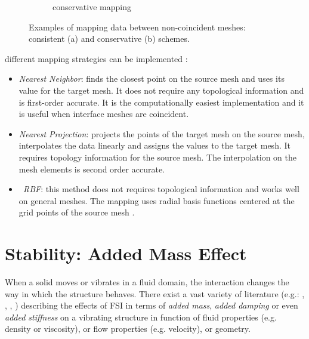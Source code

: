 \begin{figure}[htbp!]
\begin{subfigure}{.8\textwidth}
		\caption{conservative mapping}
		\label{fig:conservative}
	\end{subfigure}
	\caption{Examples of mapping data between non-coincident meshes: consistent (a) and conservative (b) schemes.}
	\label{fig:mapping}
\end{figure}


different mapping strategies can be implemented \cite{bungartz2016precice}:

\begin{itemize}
	\item \textit{Nearest Neighbor}: finds the closest point on the source mesh and uses its value for the target mesh. It does not require any topological information and is first-order accurate. It is the computationally easiest implementation and it is useful when interface meshes are coincident.
	\item \textit{Nearest Projection}: projects the points of the target mesh on the source mesh, interpolates the data linearly and assigns the values to the target mesh. It requires topology information for the source mesh. The interpolation on the mesh elements is second order accurate.
	\item \textit{~\ac{RBF}}: this method does not requires topological information and works well on general meshes. The mapping uses radial basis functions centered at the grid points of the source mesh \cite{lindner2017radial}.
\end{itemize}


\section{Stability: Added Mass Effect}
\label{sec:added-mass}

When a solid moves or vibrates in a fluid domain, the interaction changes the way in which the structure behaves. There exist a vast variety of literature (e.g.: \cite{chen1976added}, \cite{conca1997added}, \cite{gauthier2017numerical}, \cite{ricciardi2015modelling}) describing the effects of FSI in terms of \textit{added mass}, \textit{added damping} or even \textit{added stiffness} on a vibrating structure in function of fluid properties (e.g. density or viscosity), or flow properties (e.g. velocity), or geometry.

